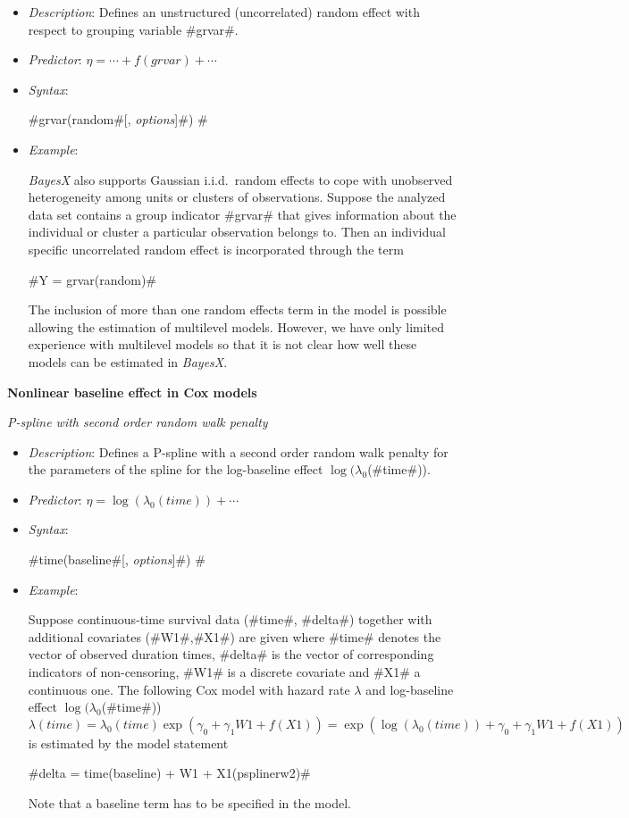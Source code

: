 \begin{itemize}
\item[] {\em Description}: Defines an unstructured (uncorrelated) random effect with respect
to grouping variable #grvar#.
\item[] {\em Predictor}: $\eta = \cdots + f(grvar) + \cdots$
\item[] {\em Syntax}:

#grvar(random#[, {\em options}]#) #
\item[] {\em Example}:

{\em BayesX} also supports Gaussian i.i.d.~random effects to cope
with unobserved heterogeneity among units or clusters of
observations. Suppose the analyzed data set contains a group
indicator #grvar# that gives information about the individual or
cluster a particular observation belongs to. Then an individual
specific uncorrelated random effect is incorporated through the
term

#Y = grvar(random)#

The inclusion of more than one random effects term in the model is
possible allowing the estimation of multilevel models. However, we
have only limited experience with multilevel models so that it is
not clear how well these models can be estimated in {\em BayesX}.
\end{itemize}

\newpage

{\bf Nonlinear baseline effect in Cox models}
\medskip

{\em P-spline with second order random walk penalty}

\begin{itemize}
\item[] {\em Description}: Defines a P-spline with a second order random walk penalty for the
parameters of the spline for the log-baseline effect
$\log(\lambda_0$(#time#)).
\item[] {\em Predictor}: $\eta = \log(\lambda_0(time)) + \cdots$
\item[] {\em Syntax}:

#time(baseline#[, {\em options}]#) #
\item[] {\em Example}:

Suppose continuous-time survival data (#time#, #delta#) together
with additional covariates (#W1#,#X1#) are given where #time#
denotes the vector of observed duration times, #delta# is the
vector of corresponding indicators of non-censoring, #W1# is a
discrete covariate and #X1# a continuous one. The following Cox
model with hazard rate $\lambda$ and log-baseline effect
$\log(\lambda_0$(#time#))
\[
\lambda(time)=\lambda_0(time)\exp (\gamma_0 + \gamma_1 W1 + f(X1)
)=\exp\left(\log(\lambda_0(time)) + \gamma_0 + \gamma_1 W1 +
f(X1)\right)
\]
is estimated by the model statement

#delta = time(baseline) + W1 + X1(psplinerw2)#

Note that a baseline term has to be specified in the model.
\end{itemize}


